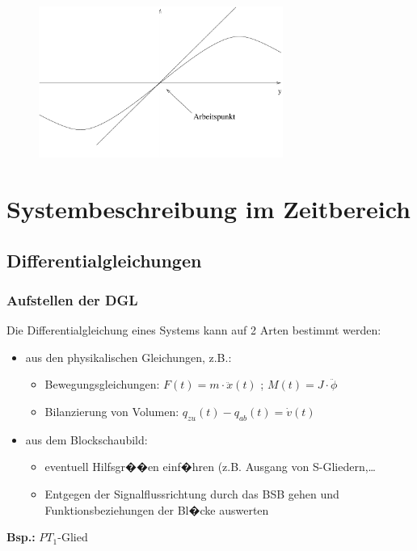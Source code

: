 \documentclass[12pt,a4paper,ngerman]{scrartcl}
\begin{document}
\begin{figure}[H]
\center
\includegraphics[width=8cm]{sysregel_linear}
\end{figure}

\section{Systembeschreibung im Zeitbereich}

\subsection{Differentialgleichungen}

\subsubsection{Aufstellen der DGL}

Die Differentialgleichung eines Systems kann auf 2 Arten bestimmt werden:
\begin{itemize}
\item aus den physikalischen Gleichungen, z.B.:
  \begin{itemize}
  \item Bewegungsgleichungen: $F(t)=m \cdot \ddot{x}(t)$ ; $M(t)=J \cdot \ddot{\phi}$
  \item Bilanzierung von Volumen: $q_{zu}(t)-q_{ab}(t)=\dot{v}(t)$ 
  \end{itemize}
\item aus dem Blockschaubild:
  \begin{itemize}
  \item eventuell Hilfsgr��en einf�hren (z.B. Ausgang von S-Gliedern,\dots
  \item Entgegen der Signalflussrichtung durch das BSB gehen und Funktionsbeziehungen der Bl�cke auswerten
   \end{itemize}
\end{itemize}
\textbf{Bsp.:} $PT_1$-Glied
\end{document}
